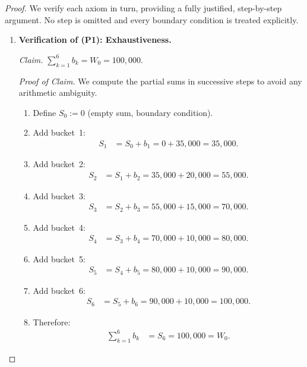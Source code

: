\documentclass[12pt,openany]{book}
\numberwithin{equation}{chapter}
\theoremstyle{plain}
\theoremstyle{definition}
\theoremstyle{remark}
\numberwithin{equation}{chapter}
\theoremstyle{plain}
\begin{document}
\begin{proof}
We verify each axiom in turn, providing a fully justified, step-by-step
argument.  No step is omitted and every boundary condition is treated
explicitly.

\begin{enumerate}

  \item \textbf{Verification of (P1): Exhaustiveness.}

        \smallskip
        \noindent
        \textit{Claim.} $\displaystyle\sum_{k=1}^{6} b_k = W_0 =
        100{,}000$.

        \smallskip
        \noindent
        \textit{Proof of Claim.}
        We compute the partial sums in successive steps to avoid any
        arithmetic ambiguity.

        \begin{enumerate}
          \item Define $S_0 := 0$ (empty sum, boundary condition).
          \item Add bucket~1:
                \begin{align}
                  S_1 &= S_0 + b_1 = 0 + 35{,}000 = 35{,}000.
                \end{align}
          \item Add bucket~2:
                \begin{align}
                  S_2 &= S_1 + b_2 = 35{,}000 + 20{,}000 = 55{,}000.
                \end{align}
          \item Add bucket~3:
                \begin{align}
                  S_3 &= S_2 + b_3 = 55{,}000 + 15{,}000 = 70{,}000.
                \end{align}
          \item Add bucket~4:
                \begin{align}
                  S_4 &= S_3 + b_4 = 70{,}000 + 10{,}000 = 80{,}000.
                \end{align}
          \item Add bucket~5:
                \begin{align}
                  S_5 &= S_4 + b_5 = 80{,}000 + 10{,}000 = 90{,}000.
                \end{align}
          \item Add bucket~6:
                \begin{align}
                  S_6 &= S_5 + b_6 = 90{,}000 + 10{,}000 = 100{,}000.
                \end{align}
          \item Therefore:
                \begin{align}
                  \sum_{k=1}^{6} b_k
                    &= S_6 = 100{,}000 = W_0.
                  \label{eq:p1-check}
                \end{align}
        \end{enumerate}


\end{enumerate}
\end{proof}
\end{document}

